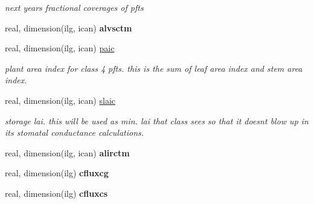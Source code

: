 \begin{DoxyCompactItemize}
\begin{DoxyCompactList}\small\item\em next year\textquotesingle{}s fractional coverages of pfts \end{DoxyCompactList}\item 
\hypertarget{structctem__statevars_1_1veg__gat_ac563d9dfaf89822aa36582d112d0beb9}{}real, dimension(ilg, ican) {\bfseries alvsctm}\label{structctem__statevars_1_1veg__gat_ac563d9dfaf89822aa36582d112d0beb9}

\item 
\hypertarget{structctem__statevars_1_1veg__gat_a4bbd901308a22d59486c8a665fe450dc}{}real, dimension(ilg, ican) \hyperlink{structctem__statevars_1_1veg__gat_a4bbd901308a22d59486c8a665fe450dc}{paic}\label{structctem__statevars_1_1veg__gat_a4bbd901308a22d59486c8a665fe450dc}

\begin{DoxyCompactList}\small\item\em plant area index for class\textquotesingle{} 4 pfts. this is the sum of leaf area index and stem area index. \end{DoxyCompactList}\item 
\hypertarget{structctem__statevars_1_1veg__gat_a98953fd6bd2f597f2cc0b61ab2a5d9ba}{}real, dimension(ilg, ican) \hyperlink{structctem__statevars_1_1veg__gat_a98953fd6bd2f597f2cc0b61ab2a5d9ba}{slaic}\label{structctem__statevars_1_1veg__gat_a98953fd6bd2f597f2cc0b61ab2a5d9ba}

\begin{DoxyCompactList}\small\item\em storage lai. this will be used as min. lai that class sees so that it doesn\textquotesingle{}t blow up in its stomatal conductance calculations. \end{DoxyCompactList}\item 
\hypertarget{structctem__statevars_1_1veg__gat_a86ea8eeea5c36a73bd27ce073705ae74}{}real, dimension(ilg, ican) {\bfseries alirctm}\label{structctem__statevars_1_1veg__gat_a86ea8eeea5c36a73bd27ce073705ae74}

\item 
\hypertarget{structctem__statevars_1_1veg__gat_aeef6566e82218dd656f1b074d62a82a9}{}real, dimension(ilg) {\bfseries cfluxcg}\label{structctem__statevars_1_1veg__gat_aeef6566e82218dd656f1b074d62a82a9}

\item 
\hypertarget{structctem__statevars_1_1veg__gat_a68c0b004a69e8a69dfcd9efc6ded0cdd}{}real, dimension(ilg) {\bfseries cfluxcs}\label{structctem__statevars_1_1veg__gat_a68c0b004a69e8a69dfcd9efc6ded0cdd}


\end{DoxyCompactItemize}

